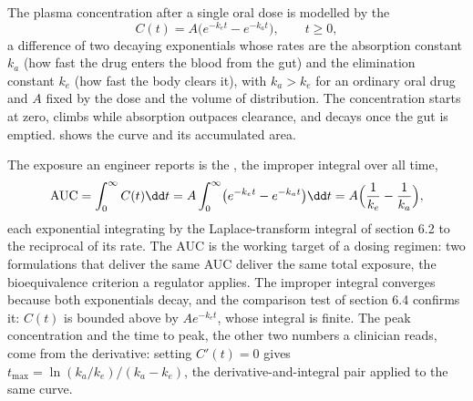 The plasma concentration after a single oral dose is modelled by the
\[
C(t) = A\bigl(e^{-k_{e}t} - e^{-k_{a}t}\bigr), \qquad t \geq 0,
\]
a difference of two decaying exponentials whose rates are the absorption
constant $k_{a}$ (how fast the drug enters the blood from the gut) and
the elimination constant $k_{e}$ (how fast the body clears it), with
$k_{a} > k_{e}$ for an ordinary oral drug and $A$ fixed by the dose and
the volume of distribution. The concentration starts at zero, climbs
while absorption outpaces clearance, and decays once the gut is emptied.
 shows the curve and its accumulated area.



The exposure an engineer reports is the ,
the improper integral over all time,
\[
\mathrm{AUC} = \int_{0}^{\infty} C(t)\dd t = A\int_{0}^{\infty}
\bigl(e^{-k_{e}t} - e^{-k_{a}t}\bigr)\dd t = A\Bigl(\frac{1}{k_{e}} -
\frac{1}{k_{a}}\Bigr),
\]
each exponential integrating by the Laplace-transform integral of
section 6.2 to the reciprocal of its rate. The AUC is the working target
of a dosing regimen: two formulations that deliver the same AUC deliver
the same total exposure, the bioequivalence criterion a regulator
applies. The improper integral converges because both exponentials
decay, and the comparison test of section 6.4 confirms it: $C(t)$ is
bounded above by $A e^{-k_{e}t}$, whose integral is finite. The peak
concentration and the time to peak, the other two numbers a clinician
reads, come from the derivative: setting $C'(t) = 0$ gives $t_{\max} =
\ln(k_{a}/k_{e})/(k_{a} - k_{e})$, the derivative-and-integral pair
applied to the same curve.

